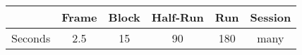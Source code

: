 \begin{tabular}{l*{5}{c}}
\toprule
	& Frame & Block & Half-Run & Run & Session \\
\midrule
Seconds	& 2.5 & 15 & 90 & 180 & many \\
\bottomrule 
\end{tabular}
